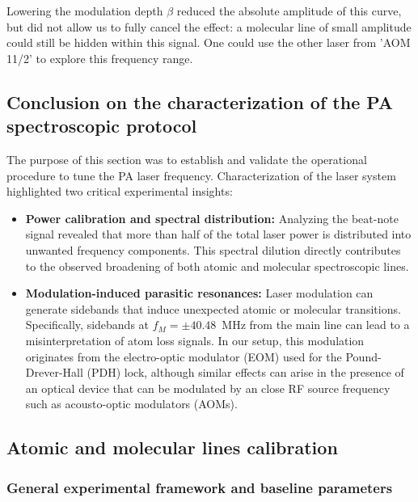 Lowering the modulation depth $\beta$ reduced the absolute amplitude of this curve, but did not allow us to fully cancel the effect: a molecular line of small amplitude could still be hidden within this signal. One could use the other laser from 'AOM 11/2' to explore this frequency range.

\subsection*{Conclusion on the characterization of the PA spectroscopic protocol}

The purpose of this section was to establish and validate the operational procedure to tune the PA laser frequency. Characterization of the laser system 
highlighted two critical experimental insights:
\begin{itemize}
    \item \textbf{Power calibration and spectral distribution:} Analyzing the beat-note signal revealed that more than half 
    of the total laser power is distributed into unwanted frequency components. This spectral dilution directly contributes to the observed broadening of both 
    atomic and molecular spectroscopic lines.
    
    \item \textbf{Modulation-induced parasitic resonances:} Laser modulation can generate sidebands that induce unexpected atomic or molecular transitions. 
    Specifically, sidebands at $f_M = \pm 40.48$~MHz from the main line can lead to a misinterpretation of atom loss signals. In our setup, this modulation 
    originates from the electro-optic modulator (EOM) used for the Pound-Drever-Hall (PDH) lock, although similar effects can arise in the presence of 
    an optical device that can be modulated by an close RF source frequency such as acousto-optic modulators (AOMs).
\end{itemize}
\subsection{Atomic and molecular lines calibration}
\subsubsection{General experimental framework and baseline parameters}
\label{sec:88Sr_framework}

